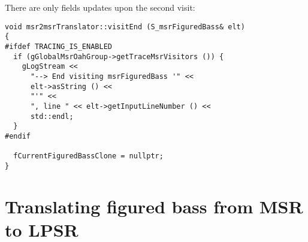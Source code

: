 There are only fields updates upon the second visit:
\begin{lstlisting}[language=CPlusPlus]
void msr2msrTranslator::visitEnd (S_msrFiguredBass& elt)
{
#ifdef TRACING_IS_ENABLED
  if (gGlobalMsrOahGroup->getTraceMsrVisitors ()) {
    gLogStream <<
      "--> End visiting msrFiguredBass '" <<
      elt->asString () <<
      "'" <<
      ", line " << elt->getInputLineNumber () <<
      std::endl;
  }
#endif

  fCurrentFiguredBassClone = nullptr;
}
\end{lstlisting}


\section{Translating figured bass from MSR to LPSR}

